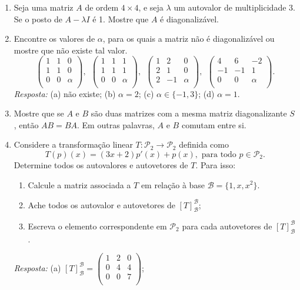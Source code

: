 \documentclass[10pt]{article}
\theoremstyle{plain}
\theoremstyle{obs}
\numberwithin{equation}{section}
\begin{document}
\begin{enumerate}
{\it Dica:} Analize $Nuc(A-\lambda I)$, para 
$\lambda$ sendo um autovalor adequado. 
 \item Seja uma matriz $A$ de ordem $4\times4$, e seja $\lambda$
 um autovalor de multiplicidade 3. Se o posto de $A-\lambda I$ é 1.
 Mostre que $A$ é diagonalizável.
 \item Encontre os valores de $\alpha$, para os quais a matriz não é diagonalizável ou mostre que 
 não existe tal valor.
 $$
\begin{pmatrix}
1 & 1 & 0 \\
1 & 1 & 0 \\
0 & 0 & \alpha \\
\end{pmatrix}, \ \
\begin{pmatrix}
1 & 1 & 1 \\%
1 & 1 & 1 \\
0 & 0 & \alpha \\
\end{pmatrix}, \ \  
\begin{pmatrix}
1 & 2 & 0 \\
2 & 1 & 0 \\
2 & -1 & \alpha \\
\end{pmatrix}, \ \
\begin{pmatrix}
4 & 6 & -2 \\%
-1 & -1 & 1 \\
0 & 0 & \alpha \\
\end{pmatrix}.  
 $$ 
 {\it Resposta:} (a) não existe; (b) $\alpha=2$; 
 (c) $\alpha \in \{-1,3\}$; (d) $\alpha=1$.
 \item Mostre que se $A$ e $B$ são duas matrizes com a mesma matriz
 diagonalizante $S$, então $AB=BA$. Em outras palavras, $A$ e $B$ comutam
 entre si.
 
 \item Considere a transformação linear $T:\mathcal{P}_{2}\rightarrow \mathcal{P}_2$
 definida como 
 $$T(p)(x)=(3x+2)p'(x)+p(x), \text{ para todo } p \in \mathcal{P}_2.$$
 Determine todos os autovalores e autovetores de $T$.
 Para isso:
   \begin{enumerate}
    \item Calcule a matriz associada a $T$ em relação à base 
    $\mathcal{B}=\{1,x,x^{2}\}$.
    \item Ache todos os autovalor e autovetores de $[T]_{\mathcal{B}}^{\mathcal{B}}$;
    \item Escreva o elemento correspondente em $\mathcal{P}_2$ para cada autovetores 
    de $[T]_{\mathcal{B}}^{\mathcal{B}}$.
   \end{enumerate}
  {\it Resposta: } 
  (a)
  $
  [T]_{\mathcal{B}}^{\mathcal{B}}=
  \begin{pmatrix}
1 & 2 & 0 \\%
0 & 4 & 4 \\
0 & 0 & 7 \\
\end{pmatrix}$; 
  

\end{enumerate}
\end{document}
